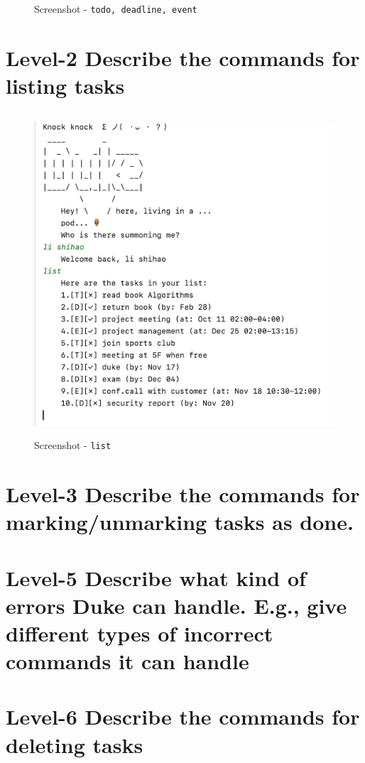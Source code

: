 \documentclass[a4paper,11pt, twoside]{article}
\begin{document}
\begin{table} [htbp]
\begin{figure}[H]
\caption{Screenshot - \texttt{todo, deadline, event}} 
\label{startold}
\end{figure} 

\section* {Level-2  Describe the commands for listing tasks} 

\begin{figure}[h]
\left
\includegraphics[height= 12cm]{list.png}

\caption{Screenshot - \texttt{list}} 
\label{startold}
\end{figure} 


\section* {Level-3 Describe the commands for marking/unmarking tasks as done.} 

\section* {Level-5 Describe what kind of errors Duke can handle. E.g., give different types of incorrect commands it can handle} 

\section* {Level-6 Describe the commands for deleting tasks} 


\end{table}
\end{document}
